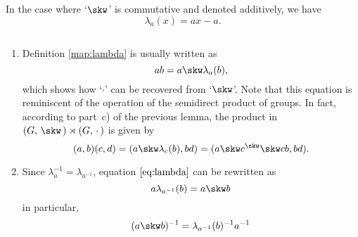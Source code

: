 \begin{rem}
    In the case where `$\skw$' is commutative and denoted additively, we have
    $$
        \lambda_a(x) = ax - a.
    $$
\end{rem}

\begin{rems}${}$
    \begin{enumerate}[-]
        \item Definition \eqref{map:lambda} is usually written as
        \begin{equation}\label{eq:lambda}
            ab = a\skw\lambda_a(b),
        \end{equation}
        which shows how `$\cdot$' can be recovered from `$\skw$'. Note that this equation is reminiscent of the operation of the semidirect product of groups. In fact, according to part~c) of the previous lemma, the product in $(G,\,\skw\,)\rtimes(G,\,\cdot\,)$ is given by
        $$
            (a,b)(c,d) = (a\skw\lambda_c(b), bd)
                = (a\skw c^\skw\skw cb, bd).
        $$
        \item Since $\lambda_a^{-1}=\lambda_{a^{-1}}$, equation $\eqref{eq:lambda}$ can be rewritten as
        \begin{equation}\label{eq:lambda-inverse}
            a\lambda_{a^{-1}}(b) = a\skw b
        \end{equation}
        in particular,
        \begin{equation}\label{eq:lambda-inverse-of-cdot}
            (a\skw b)^{-1} = \lambda_{a^{-1}}(b)^{-1}a^{-1}
        \end{equation}
    \end{enumerate}
\end{rems}

